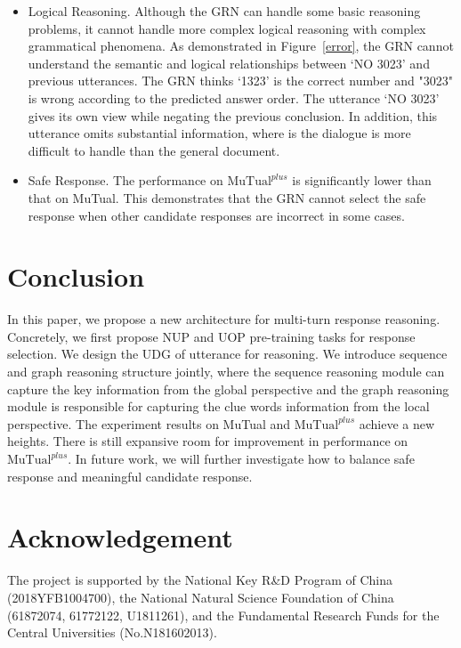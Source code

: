 \documentclass[letterpaper]{article} %
\begin{document}
\begin{itemize}
    \item Logical Reasoning. Although the GRN can handle some basic reasoning problems, it cannot handle more complex logical reasoning with complex grammatical phenomena. As demonstrated in Figure~\ref{error}, the GRN cannot understand the semantic and logical relationships between `NO 3023' and previous utterances. The GRN thinks `1323' is the correct number and "3023" is wrong according to the predicted answer order. The utterance `NO 3023' gives its own view while negating the previous conclusion. In addition, this utterance omits substantial information, where is the dialogue is more difficult to handle than the general document.
    \item Safe Response. The performance on $\text{MuTual}^{plus}$ is significantly lower than that on MuTual. This demonstrates that the GRN cannot select the safe response when other candidate responses are incorrect in some cases.
\end{itemize}

\section{Conclusion}
In this paper, we propose a new architecture for multi-turn response reasoning. Concretely, we first propose NUP and UOP pre-training tasks for response selection. We design the UDG of utterance for reasoning. We introduce sequence and graph reasoning structure jointly, where the sequence reasoning module can capture the key information from the global perspective and the graph reasoning module is responsible for capturing the clue words information from the local perspective. The experiment results on MuTual and $\text{MuTual}^{plus}$ achieve a new heights. There is still expansive room for improvement in performance on $\text{MuTual}^{plus}$. In future work, we will further investigate how to balance safe response and meaningful candidate response.
\section{Acknowledgement}
The project is supported by the National Key R\&D Program of China (2018YFB1004700), the National Natural Science Foundation of China (61872074, 61772122, U1811261), and the Fundamental Research Funds for the Central Universities (No.N181602013).

\end{document}
